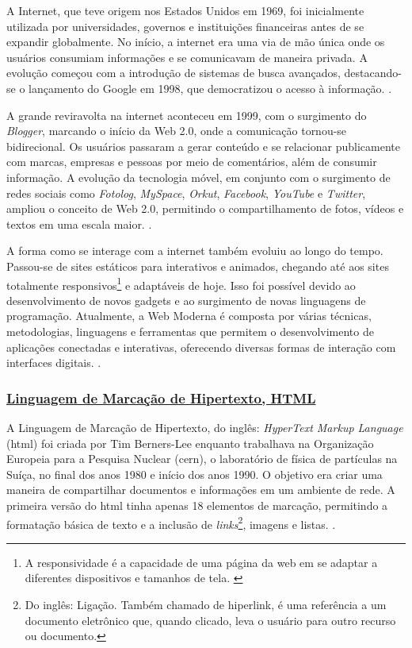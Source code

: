 A Internet, que teve origem nos Estados Unidos em 1969, foi inicialmente utilizada
por universidades, governos e instituições financeiras antes de se expandir globalmente. No
início, a internet era uma via de mão única onde os usuários consumiam informações e se
comunicavam de maneira privada. A evolução começou com a introdução de sistemas de
busca avançados, destacando-se o lançamento do Google em 1998, que democratizou o
acesso à informação.
\cite{vitoriano}.

A grande reviravolta na internet aconteceu em 1999, com o surgimento do
\textit{Blogger},
marcando o início da
Web
2.0, onde a comunicação tornou-se bidirecional. Os usuários
passaram a gerar conteúdo e se relacionar publicamente com marcas, empresas e pessoas por
meio de comentários, além de consumir informação. A evolução da tecnologia móvel, em
conjunto com o surgimento de redes sociais como
\textit{Fotolog},
\textit{MySpace},
\textit{Orkut},
\textit{Facebook},
\textit{YouTube}
e
\textit{Twitter},
ampliou o conceito de Web 2.0, permitindo o compartilhamento de fotos,
vídeos e textos em uma escala maior.
\cite{vitoriano}.

A forma como se interage com a internet também evoluiu ao longo do tempo.
Passou-se de sites estáticos para interativos e animados, chegando até aos sites totalmente
responsivos\footnote{A responsividade é a capacidade de uma página da
    \acrshort{web}
    em se adaptar a diferentes dispositivos e tamanhos de tela.
    \cite{responsivo}
}
e adaptáveis de hoje. Isso foi possível devido ao desenvolvimento de novos
gadgets e ao surgimento de novas linguagens de programação. Atualmente, a Web Moderna é
composta por várias técnicas, metodologias, linguagens e ferramentas que permitem o
desenvolvimento de aplicações conectadas e interativas, oferecendo diversas formas de
interação com interfaces digitais.
\cite{vitoriano}.

\subsubsection{\underline{Linguagem de Marcação de Hipertexto, HTML}}

A Linguagem de Marcação de Hipertexto, do inglês: \textit{HyperText Markup Language}
(\acrshort{html})
foi criada por Tim Berners-Lee enquanto trabalhava na Organização Europeia para a
Pesquisa Nuclear
(\acrshort{cern}),
o laboratório de física de partículas na Suíça, no final dos anos
1980 e início dos anos 1990. O objetivo era criar uma maneira de compartilhar documentos e
informações em um ambiente de rede. A primeira versão do
\acrshort{html}
tinha apenas 18 elementos
de marcação, permitindo a formatação básica de texto e a inclusão de
\textit{links}\footnote{Do inglês: Ligação. Também chamado de hiperlink, é uma referência a um
    documento eletrônico que, quando clicado, leva o usuário para outro recurso
    ou documento.
},
imagens e listas.
\cite{w3c}.

